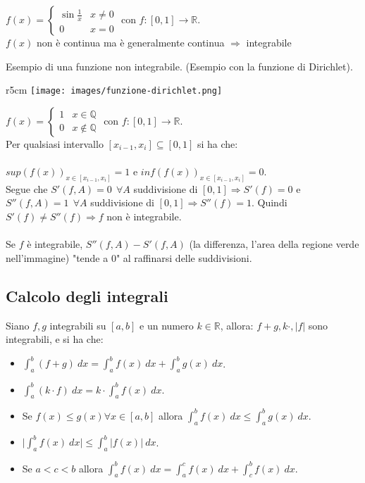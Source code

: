 \begin{example}
$f(x) = \begin{cases}\sin\frac{1}{x} & x\neq 0 \\ 0 & x=0\end{cases}$ con $f: [0,1] \to \mathbb{R}$.\\
$f(x)$ non è continua ma è generalmente continua $\Longrightarrow$ integrabile
\end{example}

\begin{example}
Esempio di una funzione non integrabile. (Esempio con la funzione di Dirichlet).
\end{example}
\begin{wrapfigure}[7]{r}{5cm}
    \vspace{-25pt}
    \centering
    \texttt{[image: images/funzione-dirichlet.png]}
\end{wrapfigure}
$f(x) = \begin{cases}1 & x\in\mathbb{Q} \\ 0 & x \notin \mathbb{Q} \end{cases}$ con $f: [0,1] \to \mathbb{R}$.\\
Per qualsiasi intervallo $[x_{i-1}, x_i] \subseteq [0,1]$ si ha che:\\\\ 
$sup(f(x))_{x \in [x_{i-1}, x_i]} = 1$ e $inf(f(x))_{x \in [x_{i-1}, x_i]} = 0$. \\
Segue che $S'(f,A) = 0 \:\: \forall A$ suddivisione di $[0,1] \Longrightarrow S'(f) = 0$ e $S''(f,A) = 1 \:\: \forall A $ suddivisione di $[0,1] \Longrightarrow S''(f) = 1$.
Quindi $S'(f) \neq S''(f) \Longrightarrow f$ non è integrabile.\\\\
\hspace{-15pt}Se $f$ è integrabile, $S''(f,A) - S'(f,A)$ (la differenza, l'area della regione verde nell'immagine) "tende a 0" al raffinarsi delle suddivisioni.

\subsection{Calcolo degli integrali}
\begin{theorem}
Siano $f,g$ integrabili su $[a,b]$ e un numero $k \in \mathbb{R}$, allora: $f+g, k\cdot, |f|$ sono integrabili, e si ha che:
\begin{itemize}
    \item $\int_a^b (f+g)\:dx = \int_a^b f(x)\:dx + \int_a^b g(x)\:dx$.
    \item $\int_a^b (k\cdot f)\:dx = k \cdot \int_a^b f(x) \:dx$.
    \item Se $f(x) \leq g(x) \forall x \in [a,b]$ allora $\int_a^b f(x) \:dx \leq \int_a^b g(x)\:dx$.
    \item $\big|\int_a^b f(x) \:dx \big| \leq \int_a^b |f(x)|\:dx$.
    \item Se $a < c < b$ allora $\int_a^b f(x) \:dx = \int_a^c f(x) \:dx + \int_c^b f(x)\:dx$.
\end{itemize}
\end{theorem}

